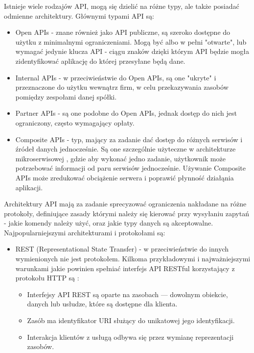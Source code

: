 \documentclass[12pt, a4paper]{article}
\begin{document}
\begin{sloppypar}
{{    Istnieje wiele rodzajów API, mogą się dzielić na różne typy, ale także posiadać
    odmienne architektury. Głównymi typami API są:
    \begin{itemize}
      \item Open APIs - znane również jako API publiczne, są szeroko dostępne do użytku z
      minimalnymi ograniczeniami. Mogą być albo w pełni "otwarte", lub wymagać jedynie
      klucza API - ciągu znaków dzięki którym API będzie mogła zidentyfikować aplikację
      do której przesyłane będą dane.
      \item Internal APIs - w przeciwieństwie do Open APIs, są one "ukryte" i przeznaczone
      do użytku wewnątrz firm, w celu przekazywania zasobów pomiędzy zespołami danej spółki.
      \item Partner APIs - są one podobne do Open APIs, jednak dostęp do nich jest
      ograniczony, często wymagający opłaty.
      \item Composite APIs - typ, mający za zadanie dać dostęp do różnych serwisów i
      źródeł danych jednocześnie. Są one szczególnie użyteczne w architekturze
      mikroserwisowej \cite{microservices}, gdzie aby wykonać jedno zadanie, użytkownik
      może potrzebować informacji od paru serwisów jednocześnie. Używanie Composite APIs
      może zredukować obciążenie serwera i poprawić płynność działąnia aplikacji.
    \end{itemize}
    Architektury API mają za zadanie sprecyzować ograniczenia nakładane na różne 
    protokoły, definiujące zasady którymi należy się kierować przy wysyłaniu zapytań -
    jakie komendy należy użyć, oraz jakie typy danych są akceptowalne. Najpopularniejszymi
    architekturami i protokołami są:
    \begin{itemize}
      \item REST (Representational State Transfer) - w przeciwieństwie do innych 
      wymienionych nie jest protokołem. Kilkoma przykładowymi i najważniejszymi warunkami
      jakie powinien spełniać interfejs API RESTful korzystający z protokołu HTTP są
      \cite{rest}:
      \begin{itemize}
        \item Interfejsy API REST są oparte na zasobach — dowolnym obiekcie, danych lub 
        usłudze, które są dostępne dla klienta.
        \item Zasób ma identyfikator URI służący do unikatowej jego identyfikacji.
        \item Interakcja klientów z usługą odbywa się przez wymianę reprezentacji zasobów.

\end{itemize}
\end{itemize}}}
\end{sloppypar}
\end{document}
